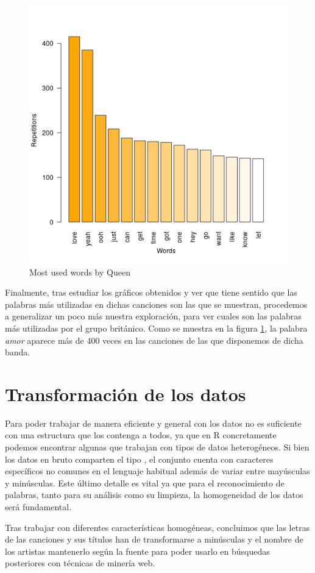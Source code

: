 \begin{figure}[h]
	\centering
	\includegraphics[width=0.7\linewidth]{Imagenes/queen_most_used_words}
	\caption{Most used words by Queen}
	\label{fig:queen_songs}
\end{figure}


Finalmente, tras estudiar los gráficos obtenidos y ver que tiene sentido que las palabras más utilizadas en dichas canciones son las que se muestran, procedemos a generalizar un poco más nuestra exploración, para ver cuales son las palabras más utilizadas por el grupo británico. Como se muestra en la figura \ref{fig:queen_songs}, la palabra \textit{amor} aparece más de 400 veces en las canciones de las que disponemos de dicha banda.


\section{Transformación de los datos}
Para poder trabajar de manera eficiente y general con los datos no es suficiente con una estructura que los contenga a todos, ya que en R concretamente podemos encontrar algunas que trabajan con tipos de datos heterogéneos. Si bien los datos en bruto comparten el tipo , el conjunto cuenta con caracteres específicos no comunes en el lenguaje habitual además de variar entre mayúsculas y minúsculas. Este último detalle es vital ya que para el reconocimiento de palabras, tanto para su análisis como su limpieza, la homogeneidad de los datos será fundamental.

Tras trabajar con diferentes características homogéneas, concluimos que las letras de las canciones y sus títulos han de transformarse a minúsculas y el nombre de los artistas mantenerlo según la fuente para poder usarlo en búsquedas posteriores con técnicas de minería web.




